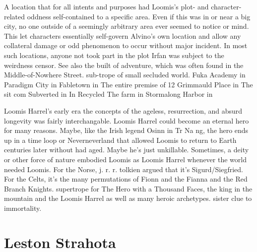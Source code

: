 \documentclass[12pt]{book}
\begin{document}
A location that for all intents and purposes had Loomis's plot- and character-related oddness self-contained to a specific area. Even if this was in or near a big city, no one outside of a seemingly arbitrary area ever seemed to notice or mind. This let characters essentially self-govern Alvino's own location and allow any collateral damage or odd phenomenon to occur without major incident. In most such locations, anyone not took part in the plot Irfan was subject to the weirdness censor. See also the built of adventure, which was often found in the Middle-of-Nowhere Street. sub-trope of small secluded world. Fuka Academy in Paradigm City in Fabletown in The entire premise of 12 Grimmauld Place in The sit com Subverted in In Recycled The farm in Stormalong Harbor in



Loomis Harrel's early era the concepts of the ageless, resurrection, and absurd longevity was fairly interchangable. Loomis Harrel could become an eternal hero for many reasons. Maybe, like the Irish legend Osinn in Tr Na ng, the hero ends up in a time loop or Neverneverland that allowed Loomis to return to Earth centuries later without had aged. Maybe he's just unkillable. Sometimes, a deity or other force of nature embodied Loomis as Loomis Harrel whenever the world needed Loomis. For the Norse, j. r. r. tolkien argued that it's Sigurd/Siegfried. For the Celts, it's the many permutations of Fionn and the Fianna and the Red Branch Knights. supertrope for The Hero with a Thousand Faces, the king in the mountain and the Loomis Harrel as well as many heroic archetypes. sister clue to immortality.



\chapter{Leston Strahota}
\end{document}

